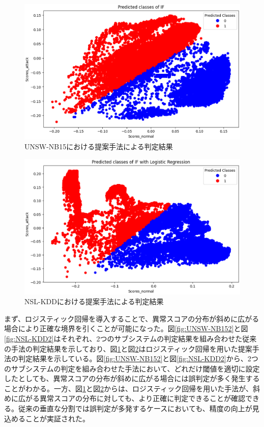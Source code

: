 \documentclass{css}
\begin{document}
\begin{figure}[ht]
    \centering
    \includegraphics[width=\linewidth]{pictures/eps/UNSW-NB153.eps}
    \caption{UNSW-NB15における提案手法による判定結果}
    \label{fig:UNSW-NB153}
\end{figure}

\begin{figure}[ht]
    \centering
    \includegraphics[width=\linewidth]{pictures/eps/NSL-KDD3.eps}
    \caption{NSL-KDDにおける提案手法による判定結果}
    \label{fig:NSL-KDD3}
\end{figure}

まず、ロジスティック回帰を導入することで、異常スコアの分布が斜めに広がる場合により正確な境界を引くことが可能になった。図\ref{fig:UNSW-NB152}と図\ref{fig:NSL-KDD2}はそれぞれ、2つのサブシステムの判定結果を組み合わせた従来の手法の判定結果を示しており、図\ref{fig:UNSW-NB153}と図\ref{fig:NSL-KDD3}はロジスティック回帰を用いた提案手法の判定結果を示している。図\ref{fig:UNSW-NB152}と図\ref{fig:NSL-KDD2}から、2つのサブシステムの判定を組み合わせた手法において、どれだけ閾値を適切に設定したとしても、異常スコアの分布が斜めに広がる場合には誤判定が多く発生することがわかる。一方、図\ref{fig:UNSW-NB153}と図\ref{fig:NSL-KDD3}からは、ロジスティック回帰を用いた手法が、斜めに広がる異常スコアの分布に対しても、より正確に判定できることが確認できる。従来の垂直な分割では誤判定が多発するケースにおいても、精度の向上が見込めることが実証された。
\end{document}
